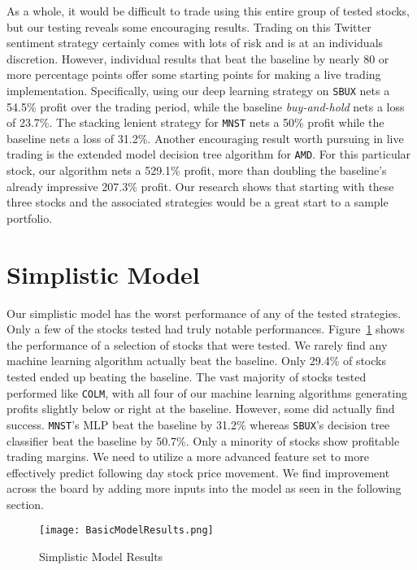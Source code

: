 \documentclass[../thesis.tex]{subfiles}
\begin{document}
As a whole, it would be difficult to trade using this entire group of tested stocks, but our testing reveals some encouraging results. Trading on this Twitter sentiment strategy certainly comes with lots of risk and is at an individuals discretion. However, individual results that beat the baseline by nearly 80 or more percentage points offer some starting points for making a live trading implementation. Specifically, using our deep learning strategy on \texttt{SBUX} nets a 54.5\% profit over the trading period, while the baseline \textit{buy-and-hold} nets a loss of 23.7\%. The stacking lenient strategy for \texttt{MNST} nets a 50\% profit while the baseline nets a loss of 31.2\%. Another encouraging result worth pursuing in live trading is the extended model decision tree algorithm for \texttt{AMD}. For this particular stock, our algorithm nets a 529.1\% profit, more than doubling the baseline's already impressive 207.3\% profit. Our research shows that starting with these three stocks and the associated strategies would be a great start to a sample portfolio.

\section{Simplistic Model}
Our simplistic model has the worst performance of any of the tested strategies. Only a few of the stocks tested had truly notable performances. Figure~\ref{simpleresults} shows the performance of a selection of stocks that were tested. We rarely find any machine learning algorithm actually beat the baseline. Only 29.4\% of stocks tested ended up beating the baseline. The vast majority of stocks tested performed like \texttt{COLM}, with all four of our machine learning algorithms generating profits slightly below or right at the baseline. However, some did actually find success. \texttt{MNST}'s MLP beat the baseline by 31.2\% whereas \texttt{SBUX}'s decision tree classifier beat the baseline by 50.7\%. Only a minority of stocks show profitable trading margins. We need to utilize a more advanced feature set to more effectively predict following day stock price movement. We find improvement across the board by adding more inputs into the model as seen in the following section. 

\begin{figure}[h]
\centering
\texttt{[image: BasicModelResults.png]}
\caption{Simplistic Model Results \label{overflow}}
\label{simpleresults}
\end{figure}
\end{document}
